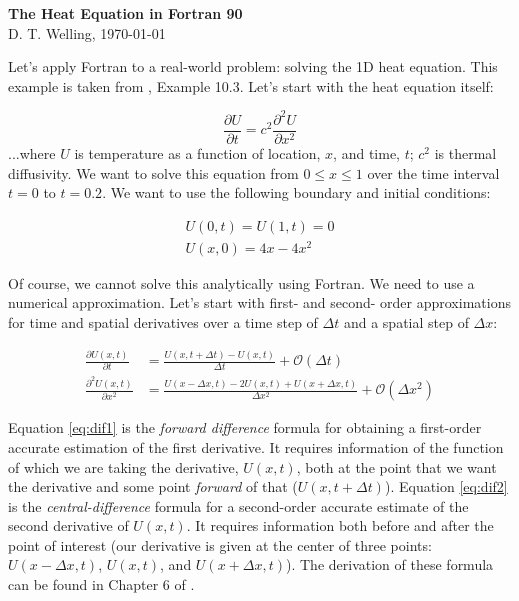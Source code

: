 \documentclass[11pt, letterpaper]{article}
\begin{document}
\setlength{\pdfpageheight}{\paperheight}
\setlength{\pdfpagewidth}{\paperwidth}

\begin{center}
  {\LARGE \textbf{The Heat Equation in Fortran 90}\\}
  {\large D. T. Welling, \today}
\end{center}

Let's apply Fortran to a real-world problem: solving the 1D heat equation.
This example is taken from \citet{Mathews2004}, Example 10.3.  Let's start
with the heat equation itself:

\begin{equation}
  \label{eq:heat}
  \frac{\partial U}{\partial t} = c^2 \frac{\partial^2 U}{\partial x^2}
\end{equation}
...where $U$ is temperature as a function of location, $x$, and time, $t$; $c^2$
is thermal diffusivity.
We want to solve this equation from $0 \leq x \leq 1$ over the time
interval $t=0$ to $t=0.2$.  We want to use the following boundary
and initial conditions:

\begin{gather}
  \label{eq:boundx}
  U(0,t) = U(1, t) = 0 \\
  \label{eq:boundt}
  U(x,0) = 4x - 4x^2
\end{gather}

Of course, we cannot solve this analytically using Fortran.  We need to use
a numerical approximation.  Let's start with first- and second- order
approximations for time and spatial derivatives over a time step of
$\Delta t$ and a spatial step of $\Delta x$:

\begin{align}
  \label{eq:dif1}
  \frac{\partial U(x,t)}{\partial t}&=\frac{U(x, t+\Delta t)-U(x,t)}{\Delta t}
  +\mathcal{O}(\Delta t)\\
  \label{eq:dif2}
  \frac{\partial^2 U(x,t)}{\partial x^2}&=
  \frac{U(x-\Delta x,t)-2U(x,t)+U(x+\Delta x,t)}{\Delta x^2}
  +\mathcal{O}(\Delta x^2)
\end{align}

Equation \ref{eq:dif1} is the \emph{forward difference} formula for
obtaining a first-order accurate estimation of the first derivative.
It requires information of the function of which we are taking the
derivative, $U(x,t)$, both at the point that we want the derivative and
some point \emph{forward} of that ($U(x,t+\Delta t)$).
Equation \ref{eq:dif2} is the \emph{central-difference} formula for
a second-order accurate estimate of
the second derivative of $U(x,t)$.  It requires information both before and
after the point of interest (our derivative is given at the center of
three points: $U(x-\Delta x, t)$, $U(x,t)$, and $U(x+\Delta x, t)$).  The
derivation of these formula can be found in Chapter 6 of \citet{Mathews2004}.
\end{document}

